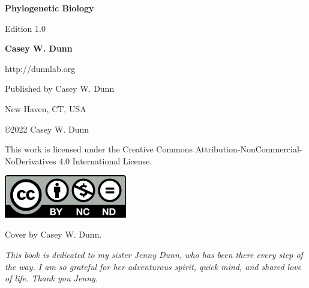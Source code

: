 \begin{titlepage}

		\vspace*{1cm}
 
		\textbf{Phylogenetic Biology}
 
		\vspace{0.5cm}
		 Edition 1.0
			 
		\vspace{1.5cm}
 
		\textbf{Casey W. Dunn}

		http://dunnlab.org
 
		\vfill
			 
		Published by Casey W. Dunn

		New Haven, CT, USA
			 
		\vspace{0.8cm}

		\copyright 2022 Casey W. Dunn
	  
		This work is licensed under the Creative Commons Attribution-NonCommercial-NoDerivatives 4.0 International License.

		\includegraphics[width=0.4\textwidth]{figures/by-nc-nd-600}

		Cover by Casey W. Dunn.
			 

 \end{titlepage}

 \newpage


 \vspace*{\fill}

\begin{center}


\emph{This book is dedicated to my sister Jenny Dunn, who has been there every step of the way. 
I am so grateful for her adventurous spirit, quick mind, and shared love of life. 
Thank you Jenny.}

\end{center}

\vspace*{\fill}
